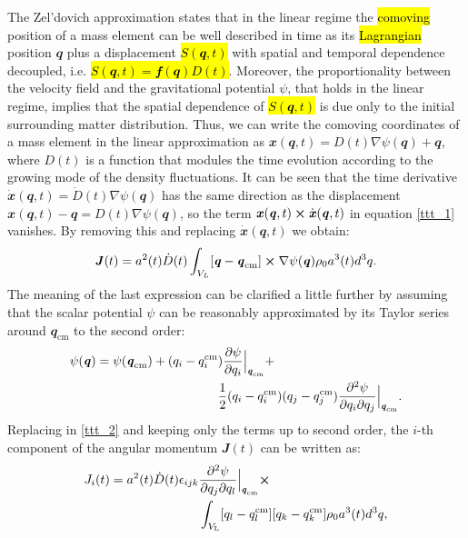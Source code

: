 \documentclass[fleqn,usenatbib]{mnras}
\begin{document}
The Zel'dovich approximation \citep{zeldovich1970} states that in the linear regime the \hl{comoving} position of a mass element can be well described in time as its \hl{Lagrangian} position $\mathbfit{q}$ plus a displacement \hl{$S(\mathbfit{q},t)$} with spatial and temporal dependence decoupled, i.e. \hl{$S(\mathbfit{q},t)=\mathbfit{f}(\mathbfit{q})D(t)$}. Moreover, the proportionality between the velocity field and the gravitational potential $\psi$, that holds in the linear regime, implies that the spatial dependence of \hl{$S(\mathbfit{q},t)$} is due only to the initial surrounding matter distribution. Thus, we can write the comoving coordinates of a mass element in the linear approximation as $\mathbfit{x}(\mathbfit{q},t)=D(t)\nabla\psi(\mathbfit{q})+\mathbfit{q}$, where $D(t)$ is a function that modules the time evolution according to the growing mode of the density fluctuations. It can be seen that the time derivative $\dot{\mathbfit{x}}(\mathbfit{q},t)=\dot{D}(t)\nabla\psi(\mathbfit{q})$ has the same direction as the displacement $\mathbfit{x}(\mathbfit{q},t)-\mathbfit{q}=D(t)\nabla\psi(\mathbfit{q})$, so the term $\mathbfit{x}(\mathbfit{q},t) \bmath{\times} \dot{\mathbfit{x}}(\mathbfit{q},t)$ in equation \eqref{ttt_1} vanishes. By removing this and replacing $\dot{\mathbfit{x}}(\mathbfit{q},t)$ we obtain:
\begin{equation}
\label{ttt_2}
\mathbfit{J}(t) = a^2(t)\dot{D}(t)\int_{V_L}[\mathbfit{q}-\mathbfit{q}_\mathrm{cm}] \bmath{\times} \nabla\psi(\mathbfit{q})\rho_0a^3(t)d^3q.
\end{equation}
The meaning of the last expression can be clarified a little further by assuming that the scalar potential $\psi$ can be reasonably approximated by its Taylor series around $\mathbfit{q}_\mathrm{cm}$ to the second order:
\begin{equation}
\begin{split}
\psi(\textbf{\textit{q}})= \psi(\textbf{\textit{q}}_\mathrm{cm})+(q_i-q^\mathrm{cm}_i&)\frac{\partial\psi}{\partial q_i} \Big|_{\textbf{\textit{q}}_\mathrm{cm}}+\\
&\frac{1}{2}(q_i-q^\mathrm{cm}_i)(q_j-q^\mathrm{cm}_j)\frac{\partial^2\psi}{\partial q_i\partial q_j}\Big|_{\textbf{\textit{q}}_\mathrm{cm}}.
\end{split}
\end{equation}
Replacing in \eqref{ttt_2} and keeping only the terms up to second order, the $i$-th component of the angular momentum $\mathbfit{J}(t)$ can be written as:
\begin{equation}
\label{ttt_3}
\begin{split}
J_i(t) = a^2(t)\dot{D}(t)\epsilon_{ijk}&\frac{\upartial^2\psi}{\upartial q_j\upartial q_l}\Big|_{\mathbfit{q}_\mathrm{cm}}\bmath{\times}\\
&\int_{V_\mathrm{L}}[q_l-q^\mathrm{cm}_l][q_k-q^\mathrm{cm}_k]\rho_0a^3(t)d^3q,
\end{split}
\end{equation}
\end{document}
